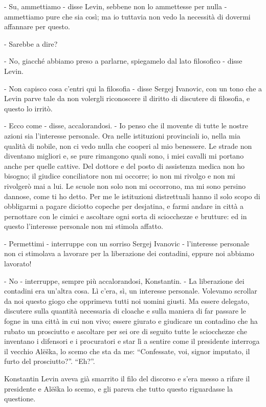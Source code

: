 - Su, ammettiamo - disse Levin, sebbene non lo ammettesse per nulla - ammettiamo pure che sia così; ma io tuttavia non vedo la necessità di dovermi affannare per questo. 

- Sarebbe a dire? 

- No, giacché abbiamo preso a parlarne, spiegamelo dal lato filosofico - disse Levin. 

- Non capisco cosa c'entri qui la filosofia - disse Sergej Ivanovic, con un tono che a Levin parve tale da non volergli riconoscere il diritto di discutere di filosofia, e questo lo irritò. 

- Ecco come - disse, accalorandosi. - Io penso che il movente di tutte le nostre azioni sia l'interesse personale. Ora nelle istituzioni provinciali io, nella mia qualità di nobile, non ci vedo nulla che cooperi al mio benessere. Le strade non diventano migliori e, se pure rimangono quali sono, i miei cavalli mi portano anche per quelle cattive. Del dottore e del posto di assistenza medica non ho bisogno; il giudice conciliatore non mi occorre; io non mi rivolgo e non mi rivolgerò mai a lui. Le scuole non solo non mi occorrono, ma mi sono persino dannose, come ti ho detto. Per me le istituzioni distrettuali hanno il solo scopo di obbligarmi a pagare diciotto copeche per desjatina, e farmi andare in città a pernottare con le cimici e ascoltare ogni sorta di sciocchezze e brutture: ed in questo l'interesse personale non mi stimola affatto. 

- Permettimi - interruppe con un sorriso Sergej Ivanovic - l'interesse personale non ci stimolava a lavorare per la liberazione dei contadini, eppure noi abbiamo lavorato! 

- No - interruppe, sempre più accalorandosi, Konstantin. - La liberazione dei contadini era un'altra cosa. Lì c'era, sì, un interesse personale. Volevamo scrollar da noi questo giogo che opprimeva tutti noi uomini giusti. Ma essere delegato, discutere sulla quantità necessaria di cloache e sulla maniera di far passare le fogne in una città in cui non vivo; essere giurato e giudicare un contadino che ha rubato un prosciutto e ascoltare per sei ore di seguito tutte le sciocchezze che inventano i difensori e i procuratori e star lì a sentire come il presidente interroga il vecchio Alëška, lo scemo che sta da me: ``Confessate, voi, signor imputato, il furto del prosciutto?''. ``Eh?''. 

Konstantin Levin aveva già smarrito il filo del discorso e s'era messo a rifare il presidente e Alëška lo scemo, e gli pareva che tutto questo riguardasse la questione. 

